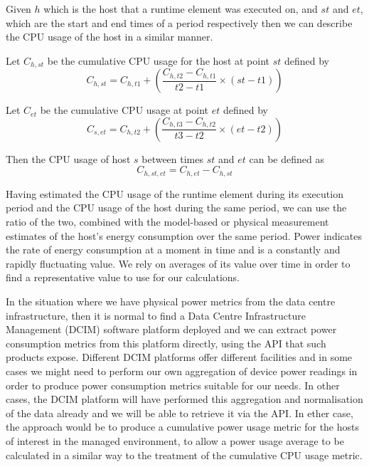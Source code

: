 Given $h$ which is the host that a runtime element was executed on, and $st$ and $et$, which are the start and end times of a period respectively then we can describe the CPU usage of the host in a similar manner.

Let $C_{h, st}$ be the cumulative CPU usage for the host at point $st$ defined by
\begin{equation}
C_{h,st} = C_{h,t1} + \left( \frac{C_{h,t2} - C_{h,t1}}{t2 - t1} \times (st - t1) \right) 
\end{equation}

Let $C_{et}$ be the cumulative CPU usage at point $et$ defined by
\begin{equation}
C_{s,et} = C_{h,t2} + \left( \frac{C_{h,t3} - C_{h,t2}}{t3 - t2} \times (et - t2) \right) 
\end{equation}

Then the CPU usage of host $s$ between times $st$ and $et$ can be defined as
\begin{equation}
C_{h,st,et} = C_{h,et} - C_{h,st}
\end{equation}

Having estimated the CPU usage of the runtime element during its execution period and the CPU usage of the host during the same period, we can use the ratio of the two, combined with the model-based or physical measurement estimates of the host's energy consumption over the same period.  Power indicates the rate of energy consumption at a moment in time and is a constantly and rapidly fluctuating value. We rely on averages of its value over time in order to find a representative value to use for our calculations.

In the situation where we have physical power metrics from the data centre infrastructure, then it is normal to find a Data Centre Infrastructure Management (DCIM) software platform deployed and we can extract power consumption metrics from this platform directly, using the API that such products expose. Different DCIM platforms offer different facilities and in some cases we might need to perform our own aggregation of device power readings in order to produce power consumption metrics suitable for our needs.  In other cases, the DCIM platform will have performed this aggregation and normalisation of the data already and we will be able to retrieve it via the API.  In ether case, the approach would be to produce a cumulative power usage metric for the hosts of interest in the managed environment, to allow a power usage average to be calculated in a similar way to the treatment of the cumulative CPU usage metric.


